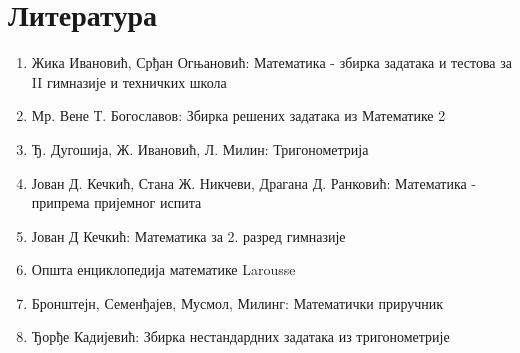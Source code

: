 \documentclass[a4paper,12pt]{article}
\begin{document}
\newpage

\section{Литература}

\begin{enumerate}
\item Жика Ивановић, Срђан Огњановић: Математика - збирка задатака и тестова за II гимназије и техничких школа
\item Мр. Вене Т. Богославов: Збирка решених задатака из Математике 2
\item Ђ. Дугошија, Ж. Ивановић, Л. Милин: Тригонометрија
\item Јован Д. Кечкић, Стана Ж. Никчеви, Драгана Д. Ранковић: Математика - припрема пријемног испита
\item Јован Д Кечкић: Математика за 2. разред гимназије
\item Општа енциклопедија математике Larousse
\item Бронштејн, Семенђајев, Мусмол, Милинг: Математички приручник
\item Ђорђе Кадијевић: Збирка нестандардних задатака из тригонометрије
\end{enumerate}
\end{document}
